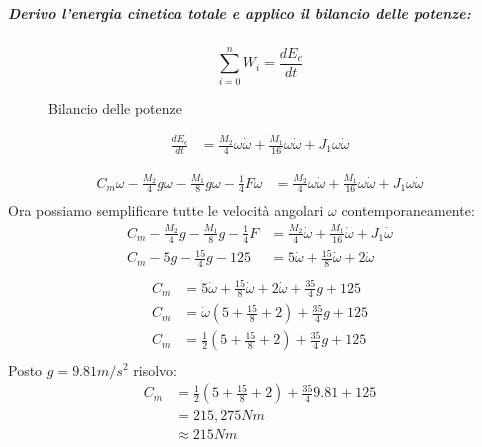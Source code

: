 \documentclass[main.tex]{subfiles}
\begin{document}
\subparagraph{Derivo l'energia cinetica totale e applico il bilancio delle potenze:}
\begin{figure}[H]
\[
  \sum_{i=0}^n W_i = \frac{dE_c}{dt}
\]
\caption{Bilancio delle potenze}
\label{bilancio_potenze}
\end{figure}

\begin{align*}
  \frac{dE_c}{dt} &= \frac{M_2}{4} \omega\dot{\omega} + \frac{M_1}{16}\omega\dot{\omega} + J_1\omega\dot{\omega}
\end{align*}

\begin{align*}
  C_m\omega - \frac{M_2}{4} g \omega - \frac{M_1}{8}g\omega - \frac{1}{4}F \omega &= \frac{M_2}{4} \omega \dot{\omega} + \frac{M_1}{16}\omega\dot{\omega} + J_1\omega\dot{\omega}\\
\end{align*}
Ora possiamo semplificare tutte le velocità angolari $\omega$ contemporaneamente:
\begin{align*}
  C_m - \frac{M_2}{4} g - \frac{M_1}{8}g - \frac{1}{4}F &= \frac{M_2}{4} \dot{\omega} + \frac{M_1}{16}\dot{\omega} + J_1\dot{\omega}\\
  C_m - 5 g - \frac{15}{4}g - 125 &= 5 \dot{\omega} + \frac{15}{8}\dot{\omega} + 2\dot{\omega}\\
\end{align*}
\begin{align*}
  C_m &= 5 \dot{\omega} + \frac{15}{8}\dot{\omega} + 2\dot{\omega} + \frac{35}{4}g + 125\\
  C_m &=  \dot{\omega}(5 + \frac{15}{8}+ 2) + \frac{35}{4}g + 125\\
  C_m &=  \frac{1}{2}(5 + \frac{15}{8}+ 2) + \frac{35}{4}g + 125\\
\end{align*}
Posto $g=9.81m/s^2$ risolvo:
\begin{align*}
  C_m &=  \frac{1}{2}(5 + \frac{15}{8}+ 2) + \frac{35}{4}9.81 + 125\\
      &= 215,275 Nm \\
      &\approx 215 Nm
\end{align*}
\clearpage
\end{document}
